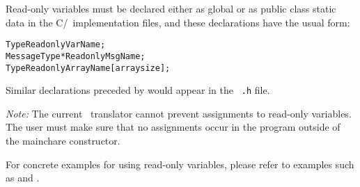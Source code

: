 Read-only variables must be declared either as global or as public class static
data in the C/\CC\ implementation files, and these declarations have the usual
form:

\begin{alltt}
 Type ReadonlyVarName;
 MessageType *ReadonlyMsgName;
 Type ReadonlyArrayName [arraysize];
\end{alltt}

Similar declarations preceded by  would appear in the {\tt
.h} file. 

{\it Note:}  The current \charmpp\ translator cannot prevent
assignments to read-only variables.  The user must make sure that no
assignments occur in the program outside of the mainchare constructor.

For concrete examples for using read-only variables, please refer to examples
such as  and .

